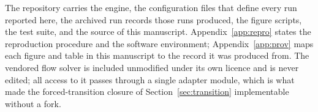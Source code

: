 The repository carries the engine, the configuration files that define every
run reported here, the archived run records those runs produced, the figure
scripts, the test suite, and the source of this manuscript.
Appendix~\ref{app:repro} states the reproduction procedure and the software
environment; Appendix~\ref{app:prov} maps each figure and table in this
manuscript to the record it was produced from. The vendored flow solver is
included unmodified under its own licence and is never edited; all access to
it passes through a single adapter module, which is what made the
forced-transition closure of Section~\ref{sec:transition} implementable
without a fork.
